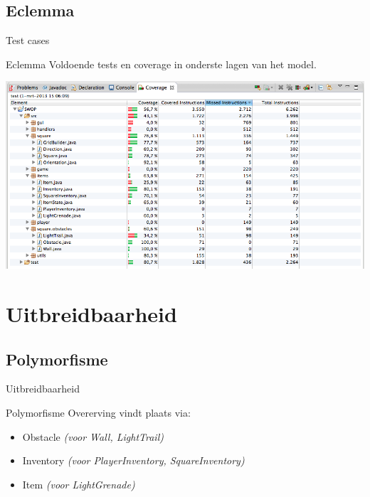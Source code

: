 \documentclass[t]{beamer}
\begin{document}
\subsection{Eclemma}
\begin{frame}{Test cases}
\begin{multicols}{2}
\tableofcontents[currentsection]
\end{multicols}
\end{frame}

\begin{frame}[plain]{Eclemma}
Voldoende tests en coverage in onderste lagen van het model.
\begin{center}
\includegraphics[width= 1\linewidth]{images/coverage.png}
\end{center}
\end{frame}


\section{Uitbreidbaarheid}
\subsection{Polymorfisme}
\begin{frame}{Uitbreidbaarheid}
\begin{multicols}{2}
\tableofcontents[currentsection]
\end{multicols}
\end{frame}

\begin{frame}{Polymorfisme}
Overerving vindt plaats via:
\begin{itemize}
	\item Obstacle \textit{(voor Wall, LightTrail)}
	\item Inventory \textit{(voor PlayerInventory, SquareInventory)}
	\item Item	\textit{(voor LightGrenade)}
\end{itemize}
\end{frame}
\end{document}
